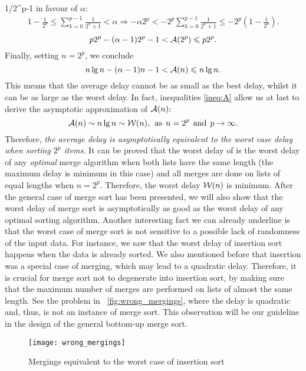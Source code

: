 1/2^{p-1}\) in favour of \(\alpha\):
\begin{gather*}
1 - \frac{1}{2^p} \leqslant \sum_{k=0}^{p-1}{\frac{1}{2^k+1}}
< \alpha
\Rightarrow
-\alpha2^p < -2^p\sum_{k=0}^{p-1}{\frac{1}{2^k+1}} \leqslant
-2^p\left(1 - \frac{1}{2^p}\right).
\end{gather*}
\begin{equation}
p2^p - (\alpha - 1)2^p - 1 < \mathcal{A}(2^p) \leqslant
p2^p.\label{ineq:A_power}
\end{equation}
Finally, setting \(n=2^p\), we conclude
\begin{equation}
n \lg n - (\alpha - 1) n - 1 < \mathcal{A}(n) \leqslant n \lg n.
\label{ineq:A}
\end{equation}
This means that the average delay cannot be as small as the best
delay, whilst it can be as large as the worst delay. In fact,
inequalities \eqref{ineq:A} allow us at last to derive the asymptotic
approximation of \(\mathcal{A}(n)\):
\[
\mathcal{A}(n) \mathrel{\sim} n \lg n \mathrel{\sim}
\mathcal{W}(n),\;\, \text{as} \,\; n=2^p \,\; \text{and} \,\; p
\rightarrow \infty.
\]
Therefore, \emph{the average delay is asymptotically equivalent to the
  worst case delay when sorting \(2^p\) items.} It can be proved that
the worst delay of  is the worst delay of any
\emph{optimal} merge algorithm when both lists have the same length
(the maximum delay is minimum in this case) and all merges are done on
lists of equal lengths when \(n=2^p\). Therefore, the worst delay
\(\mathcal{W}(n)\) is minimum. After the general case of merge sort has
been presented, we will also show that the worst delay of merge sort
is asymptotically as good as the worst delay of any optimal sorting
algorithm. Another interesting fact we can already underline is that
the worst case of merge sort is not sensitive to a possible lack of
randomness of the input data. For instance, we saw that the worst
delay of insertion sort happens when the data is already sorted. We
also mentioned before that insertion was a special case of merging,
which may lead to a quadratic delay. Therefore, it is crucial for
merge sort not to degenerate into insertion sort, by making sure that
the maximum number of merges are performed on lists of almost the same
length. See the problem in \fig~\vref{fig:wrong_mergings}, where the
delay is quadratic and, thus, is not an instance of merge sort. This
observation will be our guideline in the design of the general
bottom\hyp{}up merge sort.
\begin{figure}[t]
\centering
\texttt{[image: wrong\_mergings]}
\caption{Mergings equivalent to the worst case of insertion sort
\label{fig:wrong_mergings}}
\end{figure}

